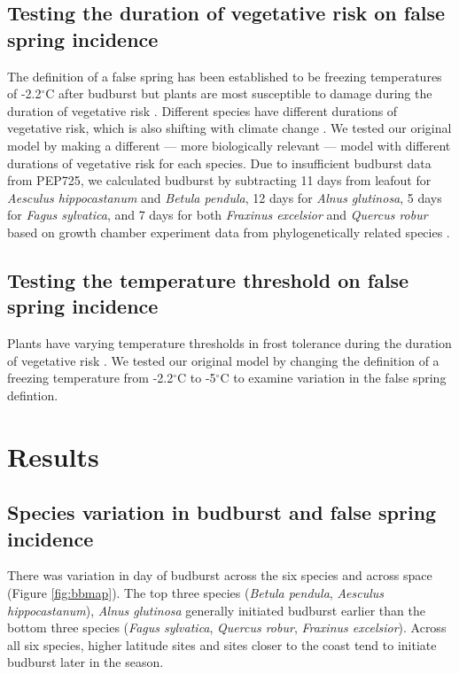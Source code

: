 \documentclass{article}\usepackage[]{graphicx}\usepackage[]{color}
\begin{document}
\subsection*{Testing the duration of vegetative risk on false spring incidence}
The definition of a false spring has been established to be freezing temperatures of -2.2$^{\circ}$C \citep{Schwartz1993} after budburst but plants are most susceptible to damage during the duration of vegetative risk \citep{Augspurger2013, Lenz2016}. Different species have different durations of vegetative risk, which is also shifting with climate change \citep{Cleland2006, Fu2015, Xin2016}. We tested our original model by making a different --- more biologically relevant --- model with different durations of vegetative risk for each species. Due to insufficient budburst data from PEP725, we calculated budburst by subtracting 11 days from leafout for \textit{Aesculus hippocastanum} and \textit{Betula pendula}, 12 days for \textit{Alnus glutinosa}, 5 days for \textit{Fagus sylvatica}, and 7 days for both \textit{Fraxinus excelsior} and \textit{Quercus robur} based on growth chamber experiment data from phylogenetically related species \citep{Buerki2010, Wang2016, Hipp2017, Flynn2018}.

\subsection*{Testing the temperature threshold on false spring incidence}
Plants have varying temperature thresholds in frost tolerance during the duration of vegetative risk \citep{Lenz2013}. We tested our original model by changing the definition of a freezing temperature from -2.2$^{\circ}$C \citep{Schwartz1993} to -5$^{\circ}$C \citep{Lenz2013, Sakai1987} to examine variation in the false spring defintion.

\section*{Results}
\subsection*{Species variation in budburst and false spring incidence}
There was variation in day of budburst across the six species and across space (Figure \ref{fig:bbmap}). The top three species (\textit{Betula pendula}, \textit{Aesculus hippocastanum}), \textit{Alnus glutinosa} generally initiated budburst earlier than the bottom three species (\textit{Fagus sylvatica}, \textit{Quercus robur}, \textit{Fraxinus excelsior}). Across all six species, higher latitude sites and sites closer to the coast tend to initiate budburst later in the season. 
\end{document}
